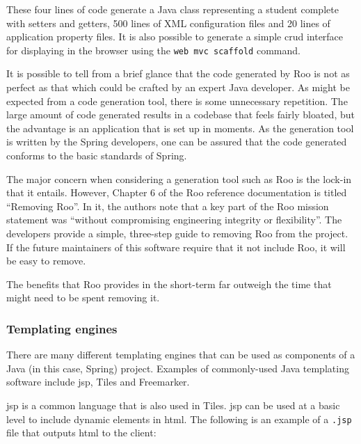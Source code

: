 \documentclass[draft]{scrartcl}
\begin{document}
These four lines of code generate a Java class representing a student complete
with setters and getters, 500 lines of XML configuration files and 20 lines of
application property files. It is also possible to generate a simple
\gls{crud} interface for displaying in the browser using the \texttt{web mvc
scaffold} command.

It is possible to tell from a brief glance that the code generated by Roo is
not as perfect as that which could be crafted by an expert Java developer. As
might be expected from a code generation tool, there is some unnecessary
repetition. The large amount of code generated results in a codebase that
feels fairly bloated, but the advantage is an application that is set up in
moments. As the generation tool is written by the Spring developers, one can
be assured that the code generated conforms to the basic standards of Spring.

The major concern when considering a generation tool such as Roo is the
lock-in that it entails. However, Chapter 6 of the Roo reference documentation
\cite{RooReferenceDocs2011} is titled ``Removing Roo''. In it, the authors
note that a key part of the Roo mission statement was ``without compromising
engineering integrity or flexibility''. The developers provide a simple,
three-step guide to removing Roo from the project. If the future maintainers
of this software require that it not include Roo, it will be easy to remove.

The benefits that Roo provides in the short-term far outweigh the time that
might need to be spent removing it.

\subsubsection{Templating engines}


There are many different templating engines that can be used as components of
a Java (in this case, Spring) project. Examples of commonly-used Java
templating software include \gls{jsp}, Tiles and Freemarker.


\gls{jsp} is a common language that is also used in Tiles. \gls{jsp} can be
used at a basic level to include dynamic elements in \gls{html}. The following
is an example of a \texttt{.jsp} file that outputs \gls{html} to the client:
\end{document}
